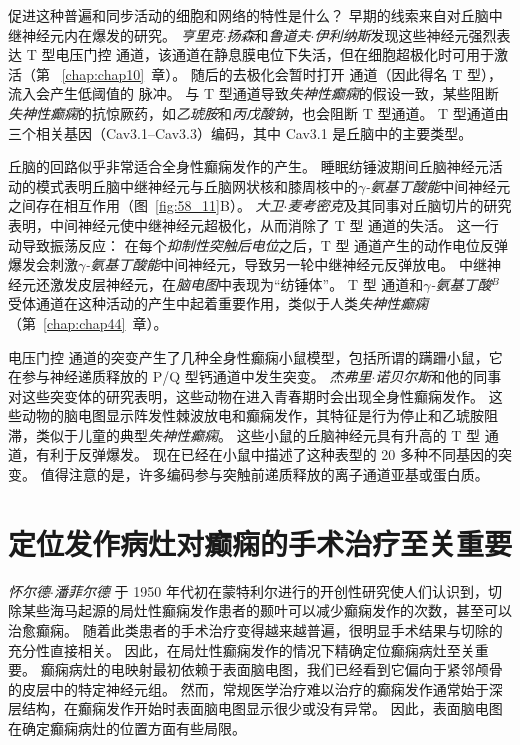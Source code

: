 促进这种普遍和同步活动的细胞和网络的特性是什么？
早期的线索来自对丘脑中继神经元内在爆发的研究。
\textit{亨里克$\cdot$扬森}和\textit{鲁道夫$\cdot$伊利纳斯}发现这些神经元强烈表达 T 型电压门控  通道，该通道在静息膜电位下失活，但在细胞超极化时可用于激活（第 ~\ref{chap:chap10}~章）。
随后的去极化会暂时打开  通道（因此得名 T 型）， 流入会产生低阈值的  脉冲。
与 T 型通道导致\textit{失神性癫痫}的假设一致，某些阻断\textit{失神性癫痫}的抗惊厥药，如\textit{乙琥胺}和\textit{丙戊酸钠}，也会阻断 T 型通道。
T 型通道由三个相关基因（Cav3.1–Cav3.3）编码，其中 Cav3.1 是丘脑中的主要类型。


丘脑的回路似乎非常适合全身性癫痫发作的产生。
睡眠纺锤波期间丘脑神经元活动的模式表明丘脑中继神经元与丘脑网状核和膝周核中的\textit{$\gamma$-氨基丁酸能}中间神经元之间存在相互作用（图~\ref{fig:58_11}B）。
\textit{大卫$\cdot$麦考密克}及其同事对丘脑切片的研究表明，中间神经元使中继神经元超极化，从而消除了 T 型  通道的失活。
这一行动导致振荡反应：
在每个\textit{抑制性突触后电位}之后，T 型  通道产生的动作电位反弹爆发会刺激\textit{$\gamma$-氨基丁酸能}中间神经元，导致另一轮中继神经元反弹放电。
中继神经元还激发皮层神经元，在\textit{脑电图}中表现为“纺锤体”。
T 型  通道和\textit{$\gamma$-氨基丁酸}$^B$ 受体通道在这种活动的产生中起着重要作用，类似于人类\textit{失神性癫痫}（第~\ref{chap:chap44}~章）。


电压门控  通道的突变产生了几种全身性癫痫小鼠模型，包括所谓的蹒跚小鼠，它在参与神经递质释放的 P/Q 型钙通道中发生突变。
\textit{杰弗里$\cdot$诺贝尔斯}和他的同事对这些突变体的研究表明，这些动物在进入青春期时会出现全身性癫痫发作。
这些动物的脑电图显示阵发性棘波放电和癫痫发作，其特征是行为停止和乙琥胺阻滞，类似于儿童的典型\textit{失神性癫痫}。
这些小鼠的丘脑神经元具有升高的 T 型  通道，有利于反弹爆发。
现在已经在小鼠中描述了这种表型的 20 多种不同基因的突变。
值得注意的是，许多编码参与突触前递质释放的离子通道亚基或蛋白质。



\section{定位发作病灶对癫痫的手术治疗至关重要}

\textit{怀尔德$\cdot$潘菲尔德 }于 1950 年代初在蒙特利尔进行的开创性研究使人们认识到，切除某些海马起源的局灶性癫痫发作患者的颞叶可以减少癫痫发作的次数，甚至可以治愈癫痫。
随着此类患者的手术治疗变得越来越普遍，很明显手术结果与切除的充分性直接相关。
因此，在局灶性癫痫发作的情况下精确定位癫痫病灶至关重要。
癫痫病灶的电映射最初依赖于表面脑电图，我们已经看到它偏向于紧邻颅骨的皮层中的特定神经元组。
然而，常规医学治疗难以治疗的癫痫发作通常始于深层结构，在癫痫发作开始时表面脑电图显示很少或没有异常。
因此，表面脑电图在确定癫痫病灶的位置方面有些局限。



